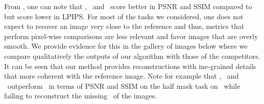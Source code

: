 From , one can note that \ddnm, \diffpir\ and \daps\ score better in PSNR and SSIM compared to \algo\; but score lower in LPIPS.
For most of the tasks we considered, one does not expect to recover an image very close to the reference and thus, metrics that perform pixel-wise comparisons are less relevant and favor images that are overly smooth.
We provide evidence for this in the gallery of images below where we compare qualitatively the outputs of our algorithm with those of the competitors.
It can be seen that our method provides reconstructions with ine-grained details that more coherent with the reference image.
Note for example that \ddnm, \diffpir\ and \daps\ outperform \algo\ in terms of PSNR and SSIM on the half mask task on \imagenet\ while failing to reconstruct the missing \rhs\ of the images. 






